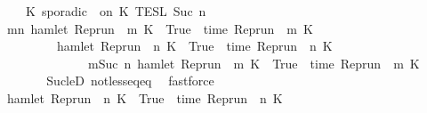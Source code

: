 \begin{isabellebody}
\ \ \ \ {\isasymunion}\ {\isasymlbrakk}\ K\ sporadic\ {\isasymtau}\ on\ K\ {\isasymrbrakk}\isactrlsub T\isactrlsub E\isactrlsub S\isactrlsub L\isactrlbsup {\isasymge}\ Suc\ n\isactrlesup {\isacartoucheclose}\isanewline
%
\isadelimproof
\ \ %
\endisadelimproof
%
\isatagproof
{}\isamarkupfalse%
\ {\isacharminus}\isanewline
\ \ \ \ \isamarkupfalse%
\ {\isacartoucheopen}{\isacharbraceleft}\ {\isasymrho}{\isachardot}\ {\isasymexists}m{\isasymge}n{\isachardot}\ hamlet\ {\isacharparenleft}{\isacharparenleft}Rep{\isacharunderscore}run\ {\isasymrho}{\isacharparenright}\ m\ K\ {\isacharequal}\ True\ {\isasymand}\ time\ {\isacharparenleft}{\isacharparenleft}Rep{\isacharunderscore}run\ {\isasymrho}{\isacharparenright}\ m\ K\ {\isacharequal}\ {\isasymtau}\ {\isacharbraceright}\isanewline
\ \ \ \ \ \ \ \ {\isacharequal}\ {\isacharbraceleft}\ {\isasymrho}{\isachardot}\ hamlet\ {\isacharparenleft}{\isacharparenleft}Rep{\isacharunderscore}run\ {\isasymrho}{\isacharparenright}\ n\ K\ {\isacharequal}\ True\ {\isasymand}\ time\ {\isacharparenleft}{\isacharparenleft}Rep{\isacharunderscore}run\ {\isasymrho}{\isacharparenright}\ n\ K\ {\isacharequal}\ {\isasymtau}\isanewline
\ \ \ \ \ \ \ \ \ \ \ \ \ \ \ {\isasymor}\ {\isacharparenleft}{\isasymexists}m{\isasymge}Suc\ n{\isachardot}\ hamlet\ {\isacharparenleft}{\isacharparenleft}Rep{\isacharunderscore}run\ {\isasymrho}{\isacharparenright}\ m\ K\ {\isacharequal}\ True\ {\isasymand}\ time\ {\isacharparenleft}{\isacharparenleft}Rep{\isacharunderscore}run\ {\isasymrho}{\isacharparenright}\ m\ K\ {\isacharequal}\ {\isasymtau}{\isacharparenright}\ {\isacharbraceright}{\isacartoucheclose}\isanewline
\ \ \ \ \ \ \isamarkupfalse%
\ Suc{\isacharunderscore}leD\ not{\isacharunderscore}less{\isacharunderscore}eq{\isacharunderscore}eq\ \isamarkupfalse%
\ fastforce\isanewline
\ \ \ \ \isamarkupfalse%
\ \isamarkupfalse%
\ {\isacartoucheopen}{\isacharbraceleft}\ {\isasymrho}{\isachardot}\ hamlet\ {\isacharparenleft}{\isacharparenleft}Rep{\isacharunderscore}run\ {\isasymrho}{\isacharparenright}\ n\ K\ {\isacharequal}\ True\ {\isasymand}\ time\ {\isacharparenleft}{\isacharparenleft}Rep{\isacharunderscore}run\ {\isasymrho}{\isacharparenright}\ n\ K\ {\isacharequal}\ {\isasymtau}\isanewline

\end{isabellebody}
